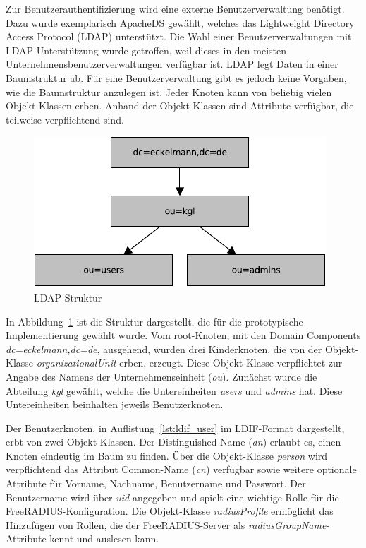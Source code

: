 \documentclass[11pt,a4paper]{report}
\begin{document}
Zur Benutzerauthentifizierung wird eine externe Benutzerverwaltung benötigt. Dazu wurde exemplarisch ApacheDS gewählt, welches das Lightweight Directory Access Protocol (LDAP) unterstützt. Die Wahl einer Benutzerverwaltungen mit LDAP Unterstützung wurde getroffen, weil dieses in den meisten Unternehmensbenutzerverwaltungen verfügbar ist. LDAP legt Daten in einer Baumstruktur ab. Für eine Benutzerverwaltung gibt es jedoch keine Vorgaben, wie die Baumstruktur anzulegen ist. Jeder Knoten kann von beliebig vielen Objekt-Klassen erben. Anhand der Objekt-Klassen sind Attribute verfügbar, die teilweise verpflichtend sind. 
\begin{figure}[htbp]
\centering
\includegraphics[scale=1.2]{images/ldap_structure.pdf}
\caption{LDAP Struktur}
\label{fig:ldap_sturcture}
\end{figure}
In Abbildung~\ref{fig:ldap_sturcture} ist die Struktur dargestellt, die für die prototypische Implementierung gewählt wurde. Vom root-Knoten, mit den Domain Components \textit{dc=eckelmann,dc=de}, ausgehend, wurden drei Kinderknoten, die von der Objekt-Klasse \textit{organizationalUnit} erben, erzeugt. Diese Objekt-Klasse verpflichtet zur Angabe des Namens der Unternehmenseinheit (\textit{ou}). Zunächst wurde die Abteilung \textit{kgl} gewählt, welche die Untereinheiten \textit{users} und \textit{admins} hat. Diese Untereinheiten beinhalten jeweils Benutzerknoten.

Der Benutzerknoten, in Auflistung~\ref{lst:ldif_user} im LDIF-Format dargestellt, erbt von zwei Objekt-Klassen. Der Distinguished Name (\textit{dn}) erlaubt es, einen Knoten eindeutig im Baum zu finden. Über die Objekt-Klasse \textit{person} wird verpflichtend das Attribut Common-Name (\textit{cn}) verfügbar sowie weitere optionale Attribute für Vorname, Nachname, Benutzername und Passwort. Der Benutzername wird über \textit{uid} angegeben und spielt eine wichtige Rolle für die FreeRADIUS-Konfiguration. Die Objekt-Klasse \textit{radiusProfile} ermöglicht das Hinzufügen von Rollen, die der FreeRADIUS-Server als \textit{radiusGroupName}-Attribute kennt und auslesen kann.
\end{document}

